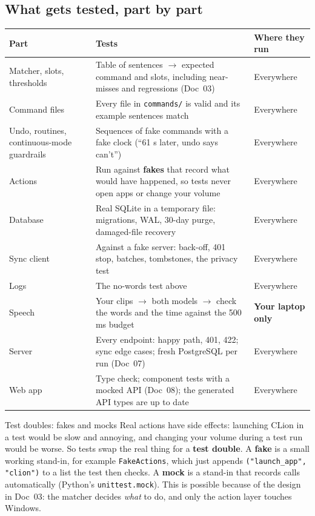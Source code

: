 \documentclass[11pt,a4paper]{article}
\begin{document}
\subsection{What gets tested, part by part}
\begin{center}
\small
\renewcommand{\arraystretch}{1.2}
\begin{tabularx}{\textwidth}{>{\raggedright\arraybackslash}p{2.6cm} >{\raggedright\arraybackslash}X >{\raggedright\arraybackslash}p{2.4cm}}
\toprule
\textbf{Part} & \textbf{Tests} & \textbf{Where they run} \\
\midrule
Matcher, slots, thresholds & Table of sentences $\to$ expected command and slots, including near-misses and regressions (Doc~03) & Everywhere \\
Command files & Every file in \texttt{commands/} is valid and its example sentences match & Everywhere \\
Undo, routines, continuous-mode guardrails & Sequences of fake commands with a fake clock (``61 s later, undo says can't'') & Everywhere \\
Actions & Run against \textbf{fakes} that record what would have happened, so tests never open apps or change your volume & Everywhere \\
Database & Real SQLite in a temporary file: migrations, WAL, 30-day purge, damaged-file recovery & Everywhere \\
Sync client & Against a fake server: back-off, 401 stop, batches, tombstones, the privacy test & Everywhere \\
Logs & The no-words test above & Everywhere \\
Speech & Your clips $\to$ both models $\to$ check the words and the time against the 500\,ms budget & \textbf{Your laptop only} \\
Server & Every endpoint: happy path, 401, 422; sync edge cases; fresh PostgreSQL per run (Doc~07) & Everywhere \\
Web app & Type check; component tests with a mocked API (Doc~08); the generated API types are up to date & Everywhere \\
\bottomrule
\end{tabularx}
\end{center}

\begin{concept}{Test doubles: fakes and mocks}
Real actions have side effects: launching CLion in a test would be slow and annoying, and
changing your volume during a test run would be worse. So tests swap the real thing for a
\textbf{test double}. A \textbf{fake} is a small working stand-in, for example
\texttt{FakeActions}, which just appends \texttt{("launch\_app", "clion")} to a list the test then
checks. A \textbf{mock} is a stand-in that records calls automatically (Python's
\texttt{unittest.mock}). This is possible because of the design in Doc~03: the matcher decides
\emph{what} to do, and only the action layer touches Windows.
\end{concept}
\end{document}
